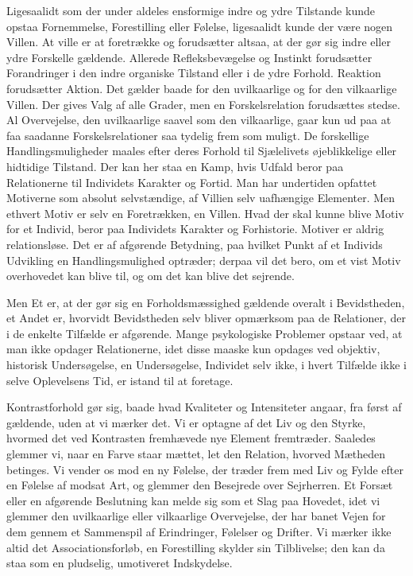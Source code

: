 \documentclass[12pt]{article}
\newcommand{\opage}[1]{\marginnote{\footnotesize\textit{[#1]}}}
\begin{document}
Ligesaalidt som der under aldeles ensformige indre og ydre Tilstande kunde
opstaa Fornemmelse, Forestilling eller Følelse, ligesaalidt kunde der være nogen
Villen. At ville er at foretrække og forudsætter altsaa, at der gør sig indre
eller ydre Forskelle gældende. Allerede Refleksbevægelse og Instinkt forudsætter
Forandringer i den indre organiske Tilstand eller i de ydre Forhold. Reaktion
forudsætter Aktion. Det gælder baade for den uvilkaarlige og for den vilkaarlige
Villen. Der gives Valg af alle Grader, men en Forskelsrelation forudsættes
stedse. Al Overvejelse, den uvilkaarlige saavel som den vilkaarlige, gaar kun ud
paa at faa saadanne Forskelsrelationer saa tydelig frem som muligt. De
forskellige Handlingsmuligheder maales efter deres Forhold til Sjælelivets
øjeblikkelige eller hidtidige Tilstand. Der kan her staa en Kamp, hvis Udfald
beror paa Relationerne til Individets Karakter og Fortid. Man har undertiden
opfattet Motiverne som absolut selvstændige, af Villien selv uafhængige
Elementer. Men ethvert Motiv er selv en Foretrækken, en Villen. Hvad der skal
kunne blive Motiv for et Individ, beror paa Individets Karakter og Forhistorie.
Motiver er aldrig relationsløse. Det er af afgørende Betydning, paa hvilket
Punkt af et Individs Udvikling en Handlingsmulighed optræder; derpaa
\opage{21} vil det bero, om et vist Motiv overhovedet kan blive til, og om det kan blive
det sejrende.

\bigskip
Men Et er, at der gør sig en Forholdsmæssighed gældende overalt i Bevidstheden,
et Andet er, hvorvidt Bevidstheden selv bliver opmærksom paa de Relationer, der
i de enkelte Tilfælde er afgørende. Mange psykologiske Problemer opstaar ved, at
man ikke opdager Relationerne, idet disse maaske kun opdages ved objektiv,
historisk Undersøgelse, en Undersøgelse, Individet selv ikke, i hvert Tilfælde
ikke i selve Oplevelsens Tid, er istand til at foretage.

Kontrastforhold gør sig, baade hvad Kvaliteter og Intensiteter angaar, fra først
af gældende, uden at vi mærker det. Vi er optagne af det Liv og den Styrke,
hvormed det ved Kontrasten fremhævede nye Element fremtræder. Saaledes glemmer
vi, naar en Farve staar \guillemotright{}mættet\guillemotleft{}, let den
Relation, hvorved Mætheden betinges. Vi vender os mod en ny Følelse, der træder
frem med Liv og Fylde efter en Følelse af modsat Art, og glemmer den Besejrede
over Sejrherren. Et Forsæt eller en afgørende Beslutning kan melde sig som
\guillemotright{}et Slag paa Hovedet\guillemotleft{}, idet vi glemmer den
uvilkaarlige eller vilkaarlige Overvejelse, der har banet Vejen for dem gennem
et Sammenspil af Erindringer, Følelser og Drifter. Vi mærker ikke altid det
Associationsforløb, en Forestilling skylder sin Tilblivelse; den kan da staa som
en pludselig, umotiveret Indskydelse.
\end{document}
